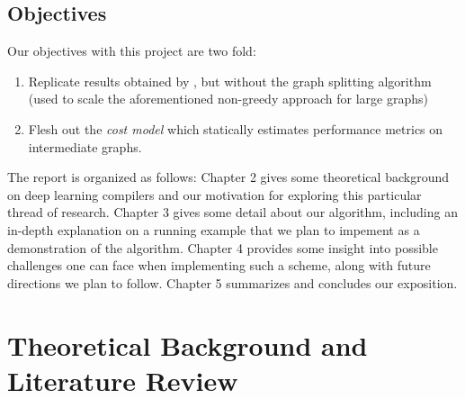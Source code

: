 \documentclass[12pt,a4paper,twoside,openright,bibliography=totocnumbered]{report}
\begin{document}
\section{Objectives}
Our objectives with this project are two fold:
\begin{enumerate}
	\item Replicate results obtained by \cite{jia2019}, but without the graph splitting algorithm (used to scale the aforementioned non-greedy approach for large graphs)
	\item Flesh out the \textit{cost model} which statically estimates performance metrics on intermediate graphs.
\end{enumerate}
	
\noindent The report is organized as follows:
Chapter 2 gives some theoretical background on deep learning compilers and our motivation for exploring this particular thread of research. Chapter 3 gives some detail about our algorithm, including an in-depth explanation on a running example that we plan to impement as a demonstration of the algorithm. Chapter 4 provides some insight into possible challenges one can face when implementing such a scheme, along with future directions we plan to follow. Chapter 5 summarizes and concludes our exposition.






\chapter{Theoretical Background and Literature Review}
\end{document}

